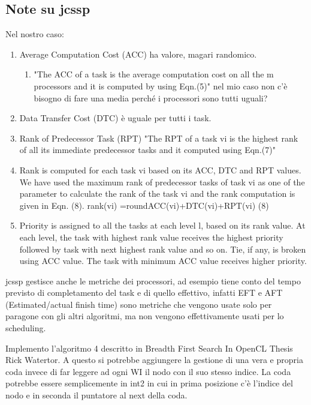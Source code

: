 \documentclass{article}
\begin{document}
        \subsection{Note su jcssp}
        Nel nostro caso:
        \begin{enumerate}
            \item Average  Computation  Cost  (ACC) ha valore, magari randomico.
            \begin{enumerate}
                \item "The   ACC   of   a   task   is   the   average   computation  cost  on  all  the  m  processors  and  it  is  computed by using Eqn.(5)" nel mio caso non c'è bisogno di fare una media perché i processori sono tutti uguali?
            \end{enumerate}
            \item Data Transfer Cost (DTC) è uguale per tutti i task.
            \item Rank of Predecessor Task   (RPT) "The  RPT  of  a  task  vi  is  the  highest  rank  of  all  its  immediate  predecessor  tasks  and  it  computed  using  Eqn.(7)"
            \item Rank  is  computed  for  each  task  vi  based  on  its  ACC,   DTC   and   RPT   values.   We   have   used   the   maximum rank of predecessor tasks of task vi as one of the parameter to calculate the rank of the task vi and the rank computation is given in Eqn. (8).  rank(vi) =round{ACC(vi)+DTC(vi)+RPT(vi) } (8)
            \item Priority  is  assigned  to  all  the  tasks  at  each  level  l, based  on  its  rank  value.  At  each  level,  the  task  with  highest    rank    value    receives    the    highest    priority    followed  by  task  with  next  highest  rank  value  and  so  on.  Tie,  if  any,  is  broken  using  ACC  value.  The  task  with  minimum  ACC value receives higher priority.
        \end{enumerate}

        jcssp gestisce anche le metriche dei processori, ad esempio tiene conto del tempo previsto di completamento del task e di quello effettivo, infatti EFT e AFT (Estimated/actual finish time) sono metriche che vengono usate solo per paragone con gli altri algoritmi, ma non vengono effettivamente usati per lo scheduling.
        
        Implemento l'algoritmo 4 descritto in Breadth First Search In OpenCL Thesis Rick Watertor.
        A questo si potrebbe aggiungere la gestione di una vera e propria coda invece di far leggere ad ogni WI il nodo con il suo stesso indice.
        La coda potrebbe essere semplicemente in int2 in cui in prima posizione c'è l'indice del nodo e in seconda il puntatore al next della coda.
\end{document}
